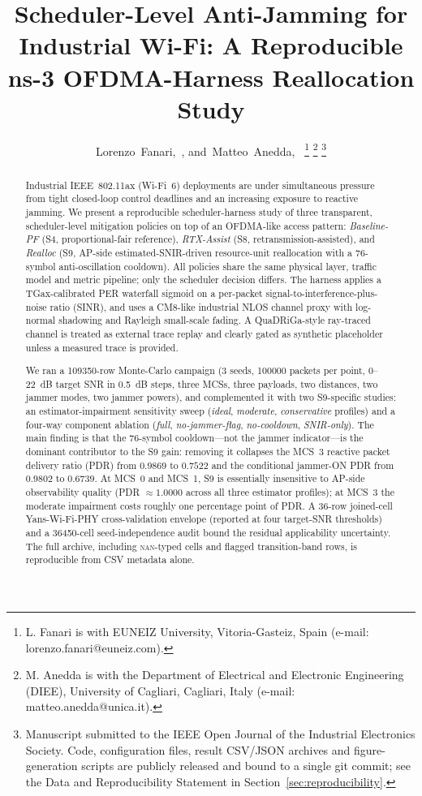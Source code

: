 \documentclass[journal,onecolumn,11pt,a4paper]{IEEEtran}
\title{Scheduler-Level Anti-Jamming for Industrial Wi-Fi:
A Reproducible ns-3 OFDMA-Harness Reallocation Study}
\author{Lorenzo~Fanari,~\IEEEmembership{Student~Member,~IEEE},
  and~Matteo~Anedda,~\IEEEmembership{Member,~IEEE}%
  \thanks{L. Fanari is with EUNEIZ University, Vitoria-Gasteiz, Spain
  (e-mail: lorenzo.fanari@euneiz.com).}%
  \thanks{M. Anedda is with the Department of Electrical and
  Electronic Engineering (DIEE), University of Cagliari, Cagliari,
  Italy (e-mail: matteo.anedda@unica.it).}%
  \thanks{Manuscript submitted to the IEEE Open Journal of the
  Industrial Electronics Society. Code, configuration files,
  result CSV/JSON archives and figure-generation scripts are
  publicly released and bound to a single git commit; see the
  Data and Reproducibility Statement in
  Section~\ref{sec:reproducibility}.}}
\begin{document}
\maketitle

\begin{abstract}
Industrial IEEE~802.11ax (Wi-Fi~6) deployments are under simultaneous
pressure from tight closed-loop control deadlines and an increasing
exposure to reactive jamming. We present a reproducible
scheduler-harness study of three transparent, scheduler-level
mitigation policies on top of an OFDMA-like access pattern:
\emph{Baseline-PF} (S4, proportional-fair reference), \emph{RTX-Assist}
(S8, retransmission-assisted), and \emph{Realloc}
(S9, AP-side estimated-SNIR-driven resource-unit reallocation with a
\SI{76}{}-symbol anti-oscillation cooldown). All policies share the
same physical layer, traffic model and metric pipeline; only the
scheduler decision differs. The harness applies a
TGax-calibrated PER waterfall sigmoid on a per-packet
signal-to-interference-plus-noise ratio (SINR), and uses a CM8-like
industrial NLOS channel proxy with log-normal shadowing and Rayleigh
small-scale fading. A QuaDRiGa-style ray-traced channel is treated as
external trace replay and clearly gated as synthetic placeholder
unless a measured trace is provided.

We ran a \num{109350}-row Monte-Carlo campaign (3 seeds, \num{100000}
packets per point, 0--\SI{22}{dB} target SNR in
\SI{0.5}{dB} steps, three MCSs, three payloads, two distances, two
jammer modes, two jammer powers), and complemented it with two
S9-specific studies: an estimator-impairment sensitivity sweep
(\emph{ideal}, \emph{moderate}, \emph{conservative} profiles) and a
four-way component ablation (\emph{full}, \emph{no-jammer-flag},
\emph{no-cooldown}, \emph{SNIR-only}). The main finding is that the
\SI{76}{}-symbol cooldown---not the jammer indicator---is the dominant
contributor to the S9 gain: removing it collapses the MCS~3 reactive
packet delivery ratio (PDR) from $0.9869$ to $0.7522$ and the
conditional jammer-ON PDR from $0.9802$ to $0.6739$. At MCS~0 and
MCS~1, S9 is essentially insensitive to AP-side observability quality
(PDR $\approx 1.0000$ across all three estimator profiles); at MCS~3
the moderate impairment costs roughly one percentage point of PDR.
A 36-row joined-cell Yans-Wi-Fi-PHY cross-validation envelope
(reported at four target-SNR thresholds) and a
\num{36450}-cell seed-independence audit bound the residual
applicability uncertainty. The full archive, including
\textsc{nan}-typed cells and flagged transition-band rows, is
reproducible from CSV metadata alone.
\end{abstract}
\end{document}
